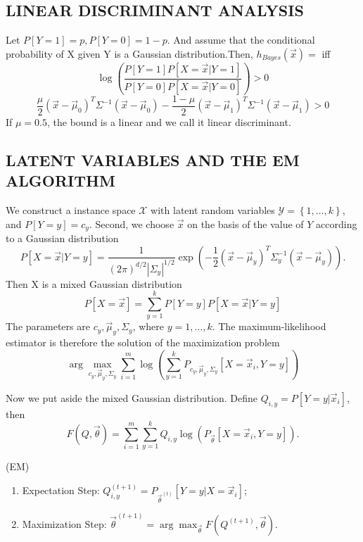 \subsection{LINEAR DISCRIMINANT ANALYSIS}%

Let $ P[Y=1] = p, P[Y=0] = 1 - p $. And assume that the conditional probability of X given Y is a Gaussian distribution.Then, $ h_{Bayes}(\vec{x}) =  $ iff
\[
    \log\left( \frac{P[Y=1] P[X = \vec{x} | Y = 1]}{P[Y = 0] P [X = \vec{x} | Y = 0]}  \right) > 0
\]
\[
    \frac{\mu}{2} {(\vec{x} - \vec{\mu}_0)}^T \Sigma^{-1}(\vec{x} - \vec\mu_0) - 
    \frac{1 - \mu}{2} {(\vec{x} - \vec{\mu}_1)}^T \Sigma^{-1}(\vec{x} - \vec\mu_1) > 0
\]
If $ \mu = 0.5 $, the bound is a linear and we call it linear discriminant.

\subsection{LATENT VARIABLES AND THE EM ALGORITHM}%
We construct a instance space $ \mathcal{X} $ with latent random variables $ \mathcal{Y} = \left\{ 1, \ldots, k \right\} $, and $ P\left[ Y = y \right] = c_y $. Second, we choose $ \vec{x} $ on the basis of the value of $ Y $ according to a Gaussian distribution
\[
    P\left[ X = \vec{x} | Y = y \right] = \frac{1}{{(2\pi)}^{d/2} \left| \Sigma_y \right|^{1/2}} \exp \left( -\frac{1}{2} {(\vec{x} - \vec{\mu}_y)}^T \Sigma^{-1}_{y} (\vec{x} - \vec{\mu}_y)  \right).
\]
Then X is a mixed Gaussian distribution
\[
    P\left[ X = \vec{x} \right] = \sum^{k}_{y=1} P\left[ Y = y \right] P \left[ X = \vec{x} | Y = y \right]
\]
The parameters are $ c_y, \vec{\mu}_y, \Sigma_y $, where $ y = 1, \ldots, k $.
The maximum-likelihood estimator is therefore the solution of the maximization problem
\[
    \arg\max_{c_y, \vec{\mu}_y, \Sigma_y} \sum^{m}_{i=1} \log \left( \sum^{k}_{y=1} P_{c_y, \vec{\mu}_y, \Sigma_y} \left[ X = \vec{x}_i, Y = y \right] \right)
\]

Now we put aside the mixed Gaussian distribution.
Define $ Q_{i,y} = P\left[ Y = y | \vec{x}_i \right] $, then
\[
    F(Q, \vec{\theta}) = \sum^{m}_{i=1} \sum^{k}_{y=1} Q_{i,y} \log(P_{ \vec{\theta}}\left[ X = \vec{x}_i, Y = y \right]).
\]
\begin{definition}
    (EM)
    \begin{enumerate}
        \item Expectation Step: $ Q^{(t+1)}_{i,y} = P_{\vec{\theta}^{(t)}} \left[ Y = y | X = \vec{x}_i \right] $;
        \item Maximization Step: $ \vec{\theta}^{(t+1)} = \arg\max_{\vec{\theta}}F(Q^{(t+1)}, \vec{\theta}) $.
    \end{enumerate}
\end{definition}

